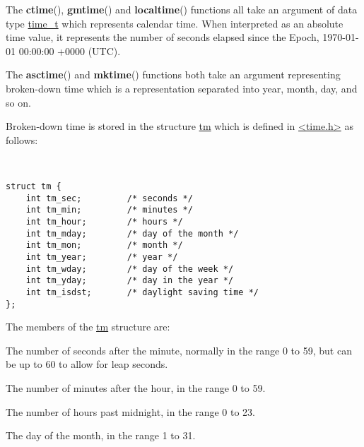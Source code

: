 \documentclass[]{article}
\let\realtextbf=\textbf
\renewcommand{\textbf}[1]{\textcolor{boldcolor}{\realtextbf{#1}}}
\renewcommand{\emph}[1]{\underline{#1}}
\begin{document}
The \textbf{ctime}(), \textbf{gmtime}() and \textbf{localtime}()
functions all take an argument of data type \emph{time\_t} which
represents calendar time. When interpreted as an absolute time value, it
represents the number of seconds elapsed since the Epoch, 1970-01-01
00:00:00 +0000 (UTC).

The \textbf{asctime}() and \textbf{mktime}() functions both take an
argument representing broken-down time which is a representation
separated into year, month, day, and so on.

Broken-down time is stored in the structure \emph{tm} which is defined
in \emph{\textless{}time.h\textgreater{}} as follows:

~

\begin{verbatim}
struct tm {
    int tm_sec;         /* seconds */
    int tm_min;         /* minutes */
    int tm_hour;        /* hours */
    int tm_mday;        /* day of the month */
    int tm_mon;         /* month */
    int tm_year;        /* year */
    int tm_wday;        /* day of the week */
    int tm_yday;        /* day in the year */
    int tm_isdst;       /* daylight saving time */
};
\end{verbatim}

The members of the \emph{tm} structure are:

\begin{description}
\itemsep1pt\parskip0pt
\item[\emph{tm\_sec}]
The number of seconds after the minute, normally in the range 0 to 59,
but can be up to 60 to allow for leap seconds.
\end{description}

\begin{description}
\itemsep1pt\parskip0pt
\item[\emph{tm\_min}]
The number of minutes after the hour, in the range 0 to 59.
\end{description}

\begin{description}
\itemsep1pt\parskip0pt
\item[\emph{tm\_hour}]
The number of hours past midnight, in the range 0 to 23.
\end{description}

\begin{description}
\itemsep1pt\parskip0pt
\item[\emph{tm\_mday}]
The day of the month, in the range 1 to 31.
\end{description}
\end{document}
